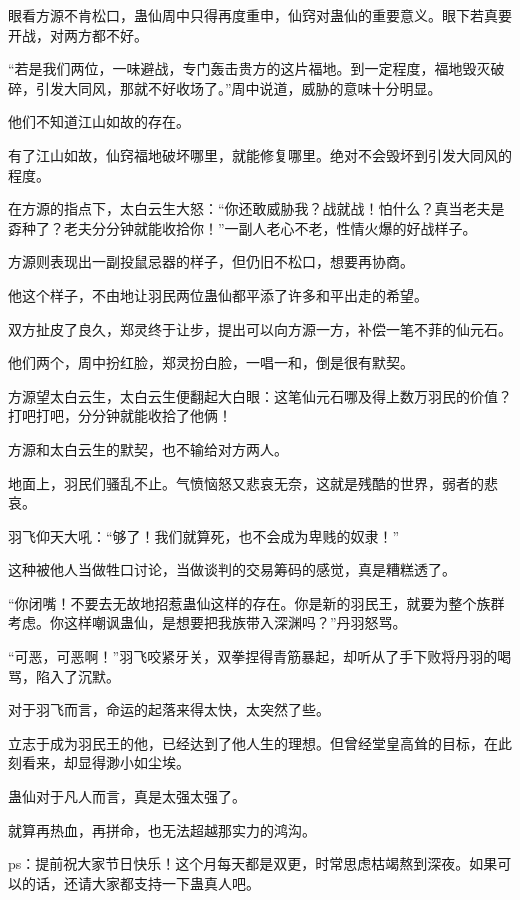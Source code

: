 \begin{this_body}
眼看方源不肯松口，蛊仙周中只得再度重申，仙窍对蛊仙的重要意义。眼下若真要开战，对两方都不好。

“若是我们两位，一味避战，专门轰击贵方的这片福地。到一定程度，福地毁灭破碎，引发大同风，那就不好收场了。”周中说道，威胁的意味十分明显。

他们不知道江山如故的存在。

有了江山如故，仙窍福地破坏哪里，就能修复哪里。绝对不会毁坏到引发大同风的程度。

在方源的指点下，太白云生大怒：“你还敢威胁我？战就战！怕什么？真当老夫是孬种了？老夫分分钟就能收拾你！”一副人老心不老，性情火爆的好战样子。

方源则表现出一副投鼠忌器的样子，但仍旧不松口，想要再协商。

他这个样子，不由地让羽民两位蛊仙都平添了许多和平出走的希望。

双方扯皮了良久，郑灵终于让步，提出可以向方源一方，补偿一笔不菲的仙元石。

他们两个，周中扮红脸，郑灵扮白脸，一唱一和，倒是很有默契。

方源望太白云生，太白云生便翻起大白眼：这笔仙元石哪及得上数万羽民的价值？打吧打吧，分分钟就能收拾了他俩！

方源和太白云生的默契，也不输给对方两人。

地面上，羽民们骚乱不止。气愤恼怒又悲哀无奈，这就是残酷的世界，弱者的悲哀。

羽飞仰天大吼：“够了！我们就算死，也不会成为卑贱的奴隶！”

这种被他人当做牲口讨论，当做谈判的交易筹码的感觉，真是糟糕透了。

“你闭嘴！不要去无故地招惹蛊仙这样的存在。你是新的羽民王，就要为整个族群考虑。你这样嘲讽蛊仙，是想要把我族带入深渊吗？”丹羽怒骂。

“可恶，可恶啊！”羽飞咬紧牙关，双拳捏得青筋暴起，却听从了手下败将丹羽的喝骂，陷入了沉默。

对于羽飞而言，命运的起落来得太快，太突然了些。

立志于成为羽民王的他，已经达到了他人生的理想。但曾经堂皇高耸的目标，在此刻看来，却显得渺小如尘埃。

蛊仙对于凡人而言，真是太强太强了。

就算再热血，再拼命，也无法超越那实力的鸿沟。

ps：提前祝大家节日快乐！这个月每天都是双更，时常思虑枯竭熬到深夜。如果可以的话，还请大家都支持一下蛊真人吧。

\end{this_body}

